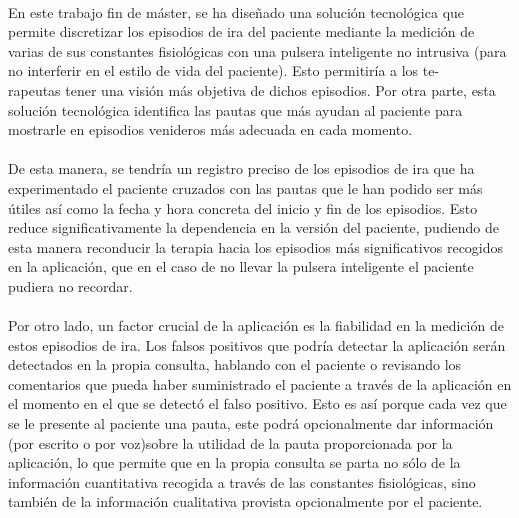 \paragraph{}
En este trabajo fin de máster, se ha diseñado una solución tecnológica que permite discretizar los episodios de ira del paciente mediante la medición de varias de sus constantes fisiológicas con una pulsera inteligente no intrusiva (para no interferir en el estilo de vida del paciente). Esto permitiría a los te-\\rapeutas tener una visión más objetiva de dichos episodios. Por otra parte, esta solución tecnológica identifica las pautas que más ayudan al paciente para mostrarle en episodios venideros más adecuada en cada momento.

\paragraph{}
De esta manera, se tendría un registro preciso de los episodios de ira que ha experimentado el paciente cruzados con las pautas que le han podido ser más útiles así como la fecha y hora concreta del inicio y fin de los episodios. Esto reduce significativamente la dependencia en la versión del paciente, pudiendo de esta manera reconducir la terapia hacia los episodios más significativos recogidos en la aplicación, que en el caso de no llevar la pulsera inteligente el paciente pudiera no recordar.

\paragraph{}
Por otro lado, un factor crucial de la aplicación es la fiabilidad en la medición de estos episodios de ira. Los falsos positivos que podría detectar la aplicación serán detectados en la propia consulta, hablando con el paciente o revisando los comentarios que pueda haber suministrado el paciente a través de la aplicación en el momento en el que se detectó el falso positivo. Esto es así porque cada vez que se le presente al paciente una pauta, este podrá opcionalmente dar información (por escrito o por voz)sobre la utilidad de la pauta proporcionada por la aplicación, lo que permite que en la propia consulta se parta no sólo de la información cuantitativa recogida a través de las constantes fisiológicas, sino también de la información cualitativa provista opcionalmente por el paciente.


